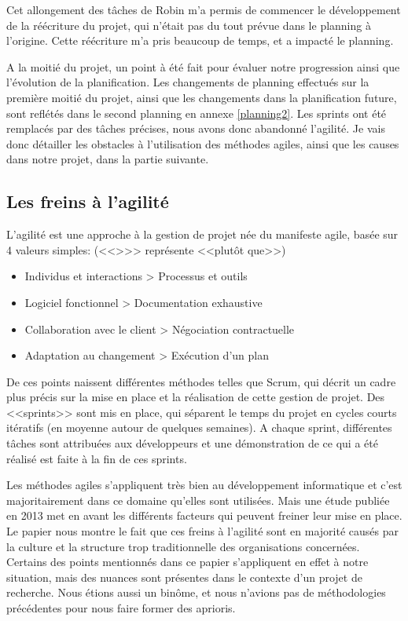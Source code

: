 \documentclass[openany, 11pt]{memoir}
\begin{document}
Cet allongement des tâches de Robin m'a permis de commencer le développement de la réécriture du projet, qui n'était pas du tout prévue dans le planning à l'origine. Cette réécriture m'a pris beaucoup de temps, et a impacté le planning.

\bigskip
A la moitié du projet, un point à été fait pour évaluer notre progression ainsi que l'évolution de la planification. Les changements de planning effectués sur la première moitié du projet, ainsi que les changements dans la planification future, sont reflétés dans le second planning en annexe \ref{planning2}. Les sprints ont été remplacés par des tâches précises, nous avons donc abandonné l'agilité. Je vais donc détailler les obstacles à l'utilisation des méthodes agiles, ainsi que les causes dans notre projet, dans la partie suivante.

\subsection{Les freins à l'agilité}

L'agilité est une approche à la gestion de projet née du manifeste agile, basée sur 4 valeurs simples: (<<{>}>> représente <<plutôt que>>)

\begin{itemize}
	\item Individus et interactions > Processus et outils
	\item Logiciel fonctionnel > Documentation exhaustive
	\item Collaboration avec le client > Négociation contractuelle
	\item Adaptation au changement > Exécution d'un plan
\end{itemize}

De ces points naissent différentes méthodes telles que Scrum, qui décrit un cadre plus précis sur la mise en place et la réalisation de cette gestion de projet. Des <<sprints>> sont mis en place, qui séparent le temps du projet en cycles courts itératifs (en moyenne autour de quelques semaines). A chaque sprint, différentes tâches sont attribuées aux développeurs et une démonstration de ce qui a été réalisé est faite à la fin de ces sprints.

\bigskip
Les méthodes agiles s'appliquent très bien au développement informatique et c'est majoritairement dans ce domaine qu'elles sont utilisées. Mais une étude publiée en 2013 \cite{obstacles} met en avant les différents facteurs qui peuvent freiner leur mise en place. Le papier nous montre le fait que ces freins à l'agilité sont en majorité causés par la culture et la structure trop traditionnelle des organisations concernées. Certains des points mentionnés dans ce papier s'appliquent en effet à notre situation, mais des nuances sont présentes dans le contexte d'un projet de recherche. Nous étions aussi un binôme, et nous n'avions pas de méthodologies précédentes pour nous faire former des aprioris.
\end{document}
